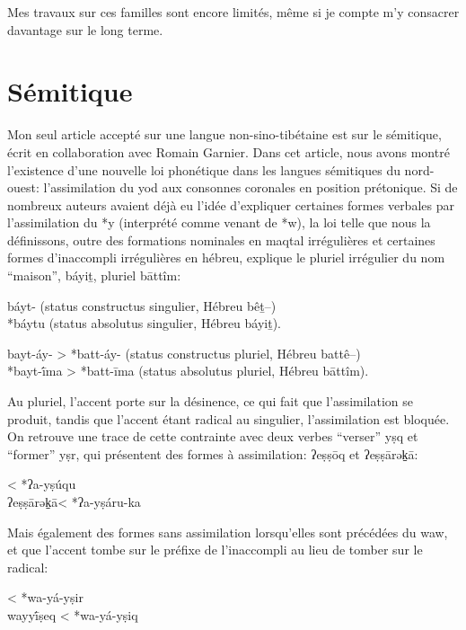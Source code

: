 \documentclass[oldfontcommands,oneside,a4paper,11pt]{memoir}
\newcommand{\ipa}[1]{{\phon #1}} %
\begin{document}
Mes travaux sur ces familles sont encore limités, même si je compte m'y consacrer davantage sur le long terme. 


\section{Sémitique}

Mon seul article accepté sur une langue non-sino-tibétaine est \citet{rg-gj12yod} sur le sémitique, écrit en collaboration avec Romain Garnier. Dans cet article, nous avons montré l'existence d'une nouvelle loi phonétique dans les langues sémitiques du nord-ouest: l'assimilation du yod aux consonnes coronales en position prétonique. Si de nombreux auteurs avaient déjà eu l'idée d'expliquer certaines formes verbales par l'assimilation du *y (interprété comme venant de *w), la loi telle que nous la définissons, outre des formations nominales en maqtal irrégulières et certaines formes d'inaccompli irrégulières en hébreu, explique le pluriel irrégulier du nom ``maison'', \ipa{báyiṯ}, pluriel \ipa{bāttîm}:
\begin{exe} 
\ex *báyt-  (status constructus singulier, Hébreu  \ipa{bêṯ}--) \\ \label{bayit.sg}
 *báytu (status absolutus singulier, Hébreu \ipa{báyiṯ}). 
\end{exe}
\begin{exe} 
\ex *bayt-áy- > *batt-áy- (status constructus pluriel, Hébreu  \ipa{battê}--) \\ \label{bayit.pl}
  *bayt-ī́ma > *batt-īma (status absolutus pluriel, Hébreu \ipa{bāttîm}).
\end{exe}
Au pluriel, l'accent porte sur la désinence, ce qui fait que l'assimilation se produit, tandis que l'accent étant radical au singulier, l'assimilation est bloquée. On retrouve une trace de cette contrainte avec deux verbes ``verser'' yṣq et ``former'' yṣr, qui présentent des formes à assimilation: \ipa{ʔeṣṣōq} et \ipa{ʔeṣṣārək̠ā}:
\begin{exe} 
\ex  \ipa{ʔeṣṣōq}   < *ʔa-yṣúqu \\
  \ipa{ʔeṣṣārək̠ā}< *ʔa-yṣáru-ka \\ 
\end{exe}
Mais également des formes sans assimilation lorsqu'elles sont précédées du waw, et que l'accent tombe sur le préfixe de l'inaccompli au lieu de tomber sur le radical:

\begin{exe} 
\ex \ipa{wayyī́ṣer}  < *wa-yá-yṣir \\
  \ipa{wayyī́ṣeq} < *wa-yá-yṣiq 
\end{exe}
 
\end{document}
